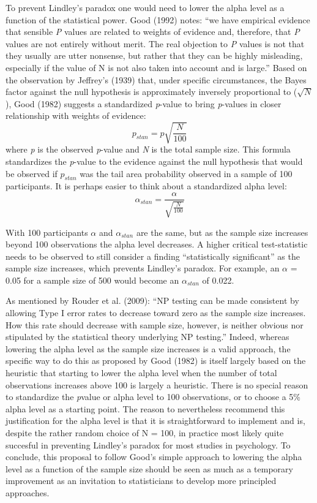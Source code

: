 \documentclass[,jou,floatsintext]{apa6}
\begin{document}
To prevent Lindley's paradox one would need to lower the alpha level as a function of the statistical power. Good (1992) notes: \enquote{we have empirical evidence that sensible \emph{P} values are related to weights of evidence and, therefore, that \emph{P} values are not entirely without merit. The real objection to \emph{P} values is not that they usually are utter nonsense, but rather that they can be highly misleading, especially if the value of N is not also taken into account and is large.} Based on the observation by Jeffrey's (1939) that, under specific circumstances, the Bayes factor against the null hypothesis is approximately inversely proportional to (\(\sqrt{N}\)), Good (1982) suggests a standardized \emph{p}-value to bring \emph{p}-values in closer relationship with weights of evidence:
\begin{equation}
p_{stan} = p\sqrt{\frac{N}{100}} 
\label{eq:pstan}
\end{equation}
where \emph{p} is the observed \emph{p}-value and \emph{N} is the total sample size. This formula standardizes the \emph{p}-value to the evidence against the null hypothesis that would be observed if \(p_{stan}\) was the tail area probability observed in a sample of 100 participants. It is perhaps easier to think about a standardized alpha level:
\begin{equation}
\alpha_{stan} = \frac{\alpha}{\sqrt{\frac{N}{100}}} \label{eq:astan}
\end{equation}

With 100 participants \(\alpha\) and \(\alpha_{stan}\) are the same, but as the sample size increases beyond 100 observations the alpha level decreases. A higher critical test-statistic needs to be observed to still consider a finding \enquote{statistically significant} as the sample size increases, which prevents Lindley's paradox. For example, an \(\alpha\) = 0.05 for a sample size of 500 would become an \(\alpha_{stan}\) of 0.022.

As mentioned by Rouder et al. (2009): \enquote{NP testing can be made consistent by allowing Type I error rates to decrease toward zero as the sample size increases. How this rate should decrease with sample size, however, is neither obvious nor stipulated by the statistical theory underlying NP testing.} Indeed, whereas lowering the alpha level as the sample size increases is a valid approach, the specific way to do this as proposed by Good (1982) is itself largely based on the heuristic that starting to lower the alpha level when the number of total observations increases above 100 is largely a heuristic. There is no special reason to standardize the \emph{p}value or alpha level to 100 observations, or to choose a 5\% alpha level as a starting point. The reason to nevertheless recommend this justification for the alpha level is that it is straightforward to implement and is, despite the rather random choice of N = 100, in practice most likely quite succesful in preventing Lindley's paradox for most studies in psychology. To conclude, this proposal to follow Good's simple approach to lowering the alpha level as a function of the sample size should be seen as much as a temporary improvement as an invitation to statisticians to develop more principled approaches.
\end{document}
